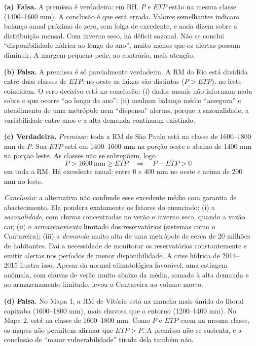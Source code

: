 \documentclass{article}%
\begin{document}
\textbf{(a) Falsa.} A premissa é verdadeira: em BH, $P$ e $ETP$ estão na mesma classe (1400--1600 mm). A conclusão é que está errada. Valores semelhantes indicam balanço anual próximo de zero, sem folga de excedente, e nada dizem sobre a distribuição mensal. Com inverno seco, há déficit sazonal. Não se conclui ``disponibilidade hídrica ao longo do ano'', muito menos que os alertas possam diminuir. A margem pequena pede, ao contrário, mais atenção.

\textbf{(b) Falsa.} A premissa é só parcialmente verdadeira. A RM do Rio está dividida entre duas classes de $ETP$: no oeste as faixas são distintas ($P > ETP$), no leste coincidem. O erro decisivo está na conclusão:
(i) dados anuais não informam nada sobre o que ocorre ``ao longo do ano'';
(ii) nenhum balanço médio ``assegura'' o atendimento de uma metrópole nem ``dispensa'' alertas, porque a sazonalidade, a variabilidade entre anos e a alta demanda continuam existindo.

\textbf{(c) Verdadeira.} \emph{Premissa:} toda a RM de São Paulo está na classe de 1600--1800 mm de $P$. Sua $ETP$ está em 1400--1600 mm na porção oeste e abaixo de 1400 mm na porção leste. As classes não se sobrepõem, logo
\[
P > 1600\ \text{mm} \geq ETP \quad\Longrightarrow\quad P - ETP > 0
\]
em toda a RM. Há excedente anual: entre 0 e 400 mm no oeste e acima de 200 mm no leste.

\emph{Conclusão:} a alternativa não confunde esse excedente médio com garantia de abastecimento. Ela pondera exatamente os fatores do enunciado:
(i) a \emph{sazonalidade}, com chuvas concentradas no verão e inverno seco, quando a vazão cai;
(ii) o \emph{armazenamento} limitado dos reservatórios (sistemas como o Cantareira);
(iii) a \emph{demanda} muito alta de uma metrópole de cerca de 20 milhões de habitantes.
Daí a necessidade de monitorar os reservatórios constantemente e emitir alertas nos períodos de menor disponibilidade. A crise hídrica de 2014--2015 ilustra isso. Apesar da normal climatológica favorável, uma estiagem anômala, com chuvas de verão muito abaixo da média, somada à alta demanda e ao armazenamento limitado, levou o Cantareira ao volume morto.

\textbf{(d) Falsa.} No Mapa 1, a RM de Vitória está na mancha mais úmida do litoral capixaba (1600--1800 mm), mais chuvosa que o entorno (1200--1400 mm). No Mapa 2, está na classe de 1600--1800 mm. Como $P$ e $ETP$ caem na mesma classe, os mapas não permitem afirmar que $ETP > P$. A premissa não se sustenta, e a conclusão de ``maior vulnerabilidade'' tirada dela também não.
\end{document}
